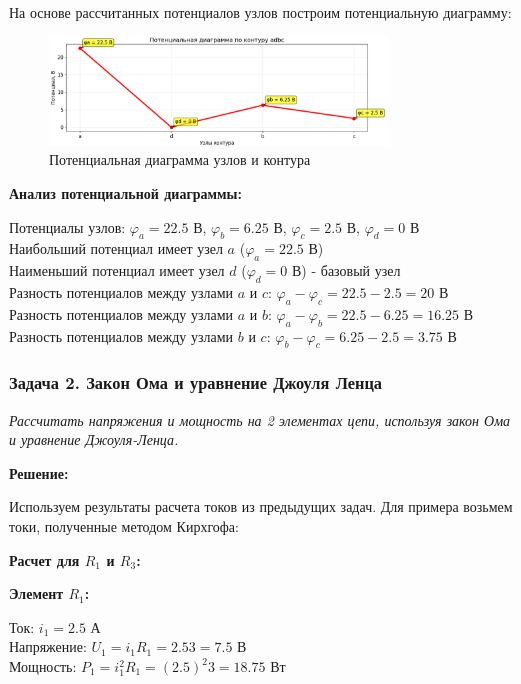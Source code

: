 На основе рассчитанных потенциалов узлов построим потенциальную диаграмму:

\begin{figure}[H]
\centering
\includegraphics[width=0.8\textwidth]{images/exanple_potential_diagram.png}
\caption{Потенциальная диаграмма узлов и контура}
\label{fig:potential_diagram}
\end{figure}

\textbf{Анализ потенциальной диаграммы:}
\begin{flushleft}
Потенциалы узлов: $\varphi_a = 22.5$ В, $\varphi_b = 6.25$ В, $\varphi_c = 2.5$ В, $\varphi_d = 0$ В \\
Наибольший потенциал имеет узел $a$ ($\varphi_a = 22.5$ В) \\
Наименьший потенциал имеет узел $d$ ($\varphi_d = 0$ В) - базовый узел \\
Разность потенциалов между узлами $a$ и $c$: $\varphi_a - \varphi_c = 22.5 - 2.5 = 20$ В \\
Разность потенциалов между узлами $a$ и $b$: $\varphi_a - \varphi_b = 22.5 - 6.25 = 16.25$ В \\
Разность потенциалов между узлами $b$ и $c$: $\varphi_b - \varphi_c = 6.25 - 2.5 = 3.75$ В
\end{flushleft}


\subsubsection{Задача 2. Закон Ома и уравнение Джоуля Ленца}
\textit{Рассчитать напряжения и мощность на 2 элементах цепи, используя закон Ома и уравнение Джоуля-Ленца.}

\textbf{Решение:}

Используем результаты расчета токов из предыдущих задач. Для примера возьмем токи, полученные методом Кирхгофа:

\textbf{Расчет для $R_1$ и $R_3$:}

\textbf{Элемент $R_1$:}
\begin{flushleft}
Ток: $i_1 = 2.5$ А \\
Напряжение: $U_1 = i_1R_1 = 2.5 3 = 7.5$ В \\
Мощность: $P_1 = i_1^2R_1 = (2.5)^2  3 = 18.75$ Вт
\end{flushleft}

